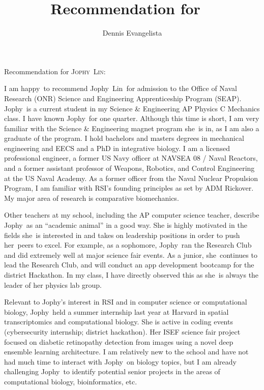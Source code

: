 \documentclass[10pt]{letter}
\title{Recommendation for \firstname\ \lastname}
\author{Dennis Evangelista}
\date{}
\newcommand\firstname{Jophy}
\newcommand\lastname{Lin}
\newcommand\subject{she}
\newcommand\possessive{her}
\newcommand\adjective{happy}
\begin{document}
\begin{letter}{%
}

\opening{Recommendation for {\scshape\firstname\ \lastname}:}

I am \adjective\ to recommend \firstname\ \lastname\ for admission to the Office of Naval Research (ONR) Science and Engineering Apprenticeship Program (SEAP). \firstname\ is a current student in my Science \& Engineering AP Physics C Mechanics class. I have known \firstname\ for one quarter. Although this time is short, I am very familiar with the Science \& Engineering magnet program \subject\ is in, as I am also a graduate of the program. I hold bachelors and masters degrees in mechanical engineering and EECS and a PhD in integrative biology. I am a licensed professional engineer, a former US Navy officer at NAVSEA 08 / Naval Reactors, and a former assistant professor of Weapons, Robotics, and Control Engineering at the US Naval Academy. As a former officer from the Naval Nuclear Propulsion Program, I am familiar with RSI's founding principles as set by ADM Rickover. My major area of research is comparative biomechanics. 

Other teachers at my school, including the AP computer science teacher, describe \firstname\ as an ``academic animal'' in a good way. She is highly motivated in the fields \subject\ is interested in and takes on leadership positions in order to push \possessive\ peers to excel. For example, as a sophomore, \firstname\ ran the Research Club and did extremely well at major science fair events. As a junior, \subject\ continues to lead the Research Club, and will conduct an app development bootcamp for the district Hackathon. In my class, I have directly observed this as \subject\ is always the leader of her physics lab group. 

Relevant to \firstname's interest in RSI and in computer science or computational biology, \firstname\ held a summer internship last year at Harvard in spatial transcriptomics and computational biology. She is active in coding events (cybersecurity internship; district hackathon). Her ISEF science fair project focused on diabetic retinopathy detection from images using a novel deep ensemble learning architecture. I am relatively new to the school and have not had much time to interact with \firstname\ on biology topics, but I am already challenging \firstname\ to identify potential senior projects in the areas of computational biology, bioinformatics, etc. 


\end{letter}
\end{document}
